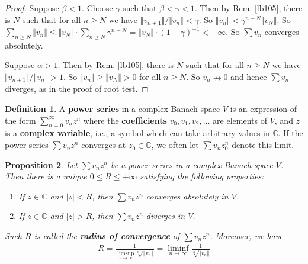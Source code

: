 \documentclass[12pt,b5paper,notitlepage]{article}
\theoremstyle{definition}
\newtheorem{df}{Definition}[section]
\theoremstyle{plain}
\newtheorem{pp}[df]{Proposition}
\newcommand{\Cbb}{\mathbb C}
\newcommand{\dps}{\displaystyle}
\numberwithin{equation}{section}
\begin{document}
\begin{proof}
Suppose $\beta<1$. Choose $\gamma$ such that $\beta<\gamma<1$. Then by Rem. \ref{lb105}, there is $N$ such that for all $n\geq N$ we have $\Vert v_{n+1}\Vert/\Vert v_n\Vert<\gamma$. So $\Vert v_n\Vert <\gamma^{n-N}\Vert v_N\Vert$. So $\sum_{n\geq N}\Vert v_n\Vert \leq \Vert v_N\Vert \cdot\sum_{n\geq N}\gamma^{n-N}=\Vert v_N\Vert\cdot (1-\gamma)^{-1}<+\infty$. So $\sum v_n$ converges absolutely.

Suppose $\alpha>1$. Then by Rem. \ref{lb105}, there is $N$ such that for all $n\geq N$ we have $\Vert v_{n+1}\Vert/\Vert v_n\Vert>1$. So $\Vert v_n\Vert\geq\Vert v_N\Vert>0$ for all $n\geq N$. So $v_n\nrightarrow 0$ and hence $\sum v_n$ diverges, as in the proof of root test.
\end{proof}









\begin{df}
A \textbf{power series} in a complex Banach space $V$  is an expression of the form $\dps\sum_{n=0}^\infty v_nz^n$ where the \textbf{coefficients} $v_0,v_1,v_2,\dots$ are elements of $V$, and $z$ is a \textbf{complex variable}, i.e., a symbol which can take arbitrary values in $\Cbb$. If the power series $\sum v_nz^n$ converges at $z_0\in\Cbb$, we often let $\sum v_n z_0^n$ denote this limit.
\end{df}


\begin{pp}\label{lb108}
Let $\sum v_n z^n$ be a power series in a complex Banach space $V$. Then there is a unique $0\leq R\leq+\infty$ satisfying the following properties:
\begin{enumerate}[label=(\alph*)]
\item If $z\in\Cbb$ and $|z|<R$, then $\sum v_n z^n$ converges absolutely in $V$.
\item If $z\in\Cbb$ and $|z|>R$, then $\sum v_n z^n$ diverges in $V$.
\end{enumerate}
Such $R$ is called the \textbf{radius of convergence}  of $\sum v_nz^n$. Moreover, we have
\begin{align}
R=\frac 1{\dps\limsup_{n\rightarrow\infty}\sqrt[n]{\Vert v_n\Vert}}=\liminf_{n\rightarrow\infty}\frac 1{\sqrt[n]{\Vert v_n\Vert}}  \label{eq30}
\end{align}
\end{pp}
\end{document}
